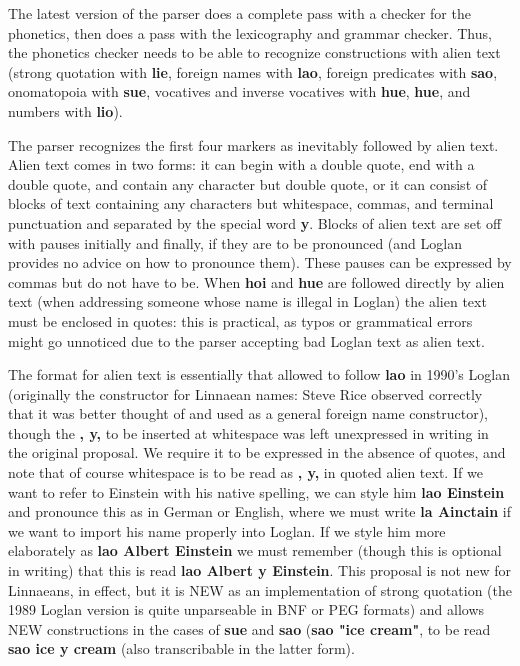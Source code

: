 \documentclass[12pt]{book}
\begin{document}
The latest version of the parser does a complete pass with a checker for the phonetics, then does a pass with the lexicography and grammar checker.
Thus, the phonetics checker needs to be able to recognize constructions with alien text (strong quotation with {\bf lie}, foreign names with {\bf lao}, foreign predicates with {\bf sao}, onomatopoia with {\bf sue}, vocatives and inverse vocatives with {\bf hue}, {\bf hue}, and numbers with {\bf lio}).

The parser recognizes the first four markers as inevitably followed by alien text.  Alien text comes in two forms:  it can begin with a double quote,
end with a double quote, and contain any character but double quote, or it can consist of blocks of text containing any characters but whitespace, commas, and terminal punctuation and separated by the special word {\bf y}.  Blocks of alien text are set off with pauses initially and finally, if they are to be pronounced (and Loglan provides no advice on how to pronounce them).  These pauses can be expressed by commas but do not have to be.  When {\bf hoi} and
{\bf hue} are followed directly by alien text (when addressing someone whose name is illegal in Loglan) the alien text must be enclosed in quotes:  this is practical, as typos or grammatical errors might go unnoticed due to the parser accepting bad Loglan text as alien text.

The format for alien text is essentially that allowed to follow {\bf lao} in 1990's Loglan (originally the constructor for Linnaean names:  Steve Rice observed correctly that it was better thought of and used as a general foreign name constructor), though the {\bf, y,} to be inserted at whitespace was left unexpressed in writing in the original proposal.   We require it to be expressed in the absence of quotes, and note that of course whitespace is to be read as {\bf, y,} in quoted alien text. If we want to refer to Einstein with his native spelling, we can style him {\bf lao Einstein} and pronounce this as in German or English, where we must write {\bf la Ainctain} if we want to import his name properly into Loglan.  If we style him more elaborately as {\bf lao Albert Einstein} we must remember (though this is optional in writing) that this is read {\bf lao Albert y Einstein}.
This proposal is not new for Linnaeans, in effect, but it is NEW as an implementation of strong quotation (the 1989 Loglan version is quite unparseable in BNF or PEG formats) and allows NEW constructions in the cases of {\bf sue} and {\bf sao} ({\bf sao "ice cream"}, to be read {\bf sao ice y cream} (also transcribable in the latter form).
\end{document}
